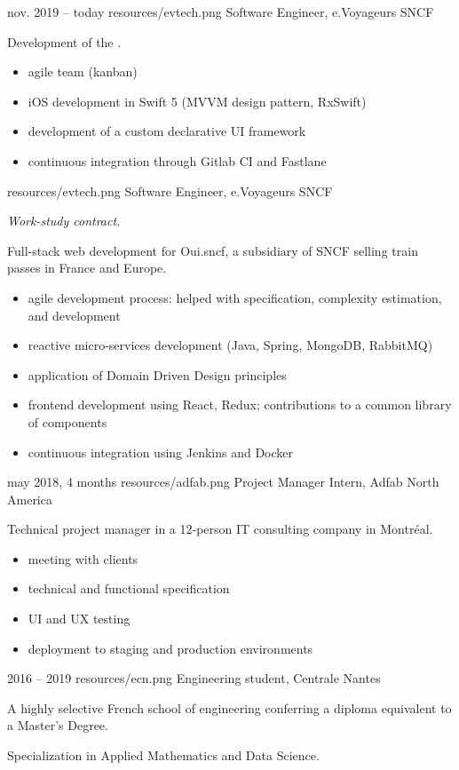 \documentclass{cv}
\begin{document}
\noindent\begin{minipage}[t]{.65\textwidth}


\experience
{{nov. 2019 -- today}}
{resources/evtech.png}
{Software Engineer, e.Voyageurs SNCF}
{
	Development of the \href{https://apps.apple.com/fr/app/oui-sncf-train-et-bus/id343889987}{}. 

	\begin{itemize}
		\item agile team (kanban)
		\item iOS development in Swift 5 (MVVM design pattern, RxSwift)
		\item development of a custom declarative UI framework
		\item continuous integration through Gitlab CI and Fastlane
	\end{itemize}
}

{resources/evtech.png}
{Software Engineer, e.Voyageurs SNCF}
{
	\textit{Work-study contract.} 

	Full-stack web development for Oui.sncf, a subsidiary of SNCF selling train passes in France and Europe.

	\begin{itemize}
		\item agile development process: helped with specification, complexity estimation, and development
		\item reactive micro-services development (Java, Spring, MongoDB, RabbitMQ)
		\item application of Domain Driven Design principles
		\item frontend development using React, Redux; contributions to a common library of components
		\item continuous integration using Jenkins and Docker
	\end{itemize}
}

\experience
{{may 2018,  4 months}}
{resources/adfab.png}
{Project Manager Intern, Adfab North America}
{
	Technical project manager in a 12-person IT consulting company in Montréal.

	\begin{itemize}
		\item meeting with clients
		\item technical and functional specification
		\item UI and UX testing
		\item deployment to staging and production environments
	\end{itemize}
}

\experience
{{2016 -- 2019}}
{resources/ecn.png}
{Engineering student, Centrale Nantes}
{
	A highly selective French school of engineering conferring a diploma equivalent to a Master’s Degree. 

	Specialization in Applied Mathematics and Data Science.
}

\end{minipage}
\end{document}
